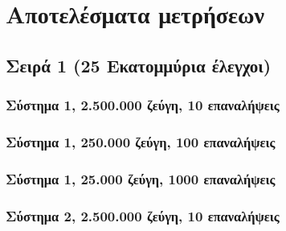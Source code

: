 \appendix
\chapter{Αποτελέσματα μετρήσεων}
\label{appendix}
\section{Σειρά 1 (25 Εκατομμύρια έλεγχοι)}

\subsection*{Σύστημα 1, 2.500.000 ζεύγη, 10 επαναλήψεις}
\begin{center}
\tabcolsep=0.11cm
\scalebox{0.55}{}
\scalebox{0.9}{
}\end{center}
\newpage

\subsection*{Σύστημα 1, 250.000 ζεύγη, 100 επαναλήψεις}\begin{center}
\tabcolsep=0.11cm
\scalebox{0.5}{
}
\scalebox{0.9}{
}\end{center}
\newpage

\subsection*{Σύστημα 1, 25.000 ζεύγη, 1000 επαναλήψεις}\begin{center}
\tabcolsep=0.11cm
\scalebox{0.5}{
}
\scalebox{0.9}{
}\end{center}
\newpage

\subsection*{Σύστημα 2, 2.500.000 ζεύγη, 10 επαναλήψεις}
\begin{center}
\tabcolsep=0.11cm
\scalebox{0.55}{}
\scalebox{0.9}{
}\end{center}
\newpage

